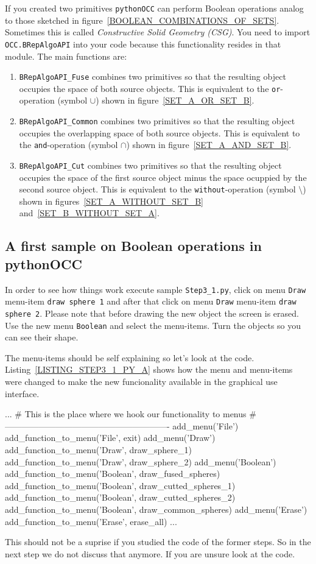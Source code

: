 If you created two primitives {\tt pythonOCC} can perform Boolean operations analog to those sketched in figure~\ref{BOOLEAN_COMBINATIONS_OF_SETS}.
Sometimes this is called {\it Constructive Solid Geometry (CSG)}.
You need to import {\tt OCC.BRepAlgoAPI} into your code because this functionality resides in that module.
The main functions are:
\begin{enumerate}
\item {\tt BRepAlgoAPI\_Fuse} combines two primitives so that the 
		resulting object occupies the space of both source objects. 
		This is equivalent to the {\tt or}-operation (symbol $\cup$) shown in
		figure~\ref{SET_A_OR_SET_B}.
\item {\tt BRepAlgoAPI\_Common} combines two primitives so that the 
		resulting object occupies the overlapping space of both source objects. 
		This is equivalent to the {\tt and}-operation (symbol $\cap$) shown in
		figure~\ref{SET_A_AND_SET_B}.
\item {\tt BRepAlgoAPI\_Cut} combines two primitives so that the 
		resulting object occupies the space of the first source object minus the 
		space ocuppied by the second source object. 
		This is equivalent to the {\tt without}-operation (symbol $\setminus$)
		shown in figures~\ref{SET_A_WITHOUT_SET_B} and~\ref{SET_B_WITHOUT_SET_A}.
\end{enumerate}

\subsection{A first sample on Boolean operations in pythonOCC}
In order to see how things work execute sample {\tt Step3\_1.py}, click on menu {\tt Draw} menu-item  {\tt draw sphere 1} and after that click on menu {\tt Draw} menu-item  {\tt draw sphere 2}.
Please note that before drawing the new object the screen is erased.
Use the new menu  {\tt Boolean} and select the menu-items.
Turn the objects so you can see their shape.

The menu-items should be self explaining so let's look at the code.
Listing~\ref{LISTING_STEP3_1_PY_A} shows how the menu and menu-items were changed to make the new funcionality available in the graphical use interface.
\begin{python}[moreemph={[4], 46, 48},caption={Step3\_1.py - Extending the menu},label=LISTING_STEP3_1_PY_A]
...
    # This is the place where we hook our functionality to menus
    # ----------------------------------------------------------
    add_menu('File')
    add_function_to_menu('File',  exit)
    add_menu('Draw')
    add_function_to_menu('Draw', draw_sphere_1)
    add_function_to_menu('Draw', draw_sphere_2)
    add_menu('Boolean')
    add_function_to_menu('Boolean', draw_fused_spheres)
    add_function_to_menu('Boolean', draw_cutted_spheres_1)
    add_function_to_menu('Boolean', draw_cutted_spheres_2)
    add_function_to_menu('Boolean', draw_common_spheres)
    add_menu('Erase')
    add_function_to_menu('Erase', erase_all)
...    
\end{python}
This should not be a suprise if you studied the code of the former steps.
So in the next step we do not discuss that anymore.
If you are unsure look at the code.


